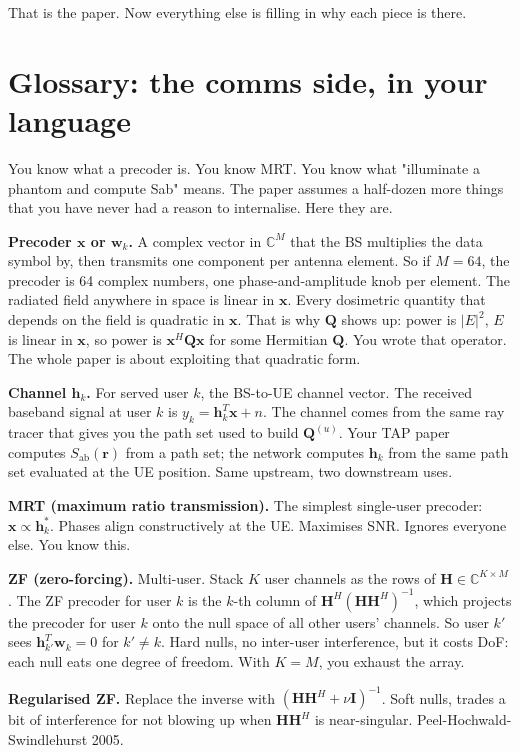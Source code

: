 \documentclass[11pt]{article}
\newenvironment{defs}[1][]{%
  \begin{mdframed}[backgroundcolor=blue!4,linecolor=blue!40!black,
    linewidth=0.4pt,roundcorner=2pt,innertopmargin=8pt,
    innerbottommargin=8pt,innerleftmargin=10pt,innerrightmargin=10pt,
    frametitle={\textbf{#1}},frametitlebackgroundcolor=blue!10]%
}{\end{mdframed}}
\newcommand{\rr}{\mathbf{r}}
\newcommand{\xx}{\mathbf{x}}
\newcommand{\hh}{\mathbf{h}}
\newcommand{\ww}{\mathbf{w}}
\newcommand{\Sab}{S_{\mathrm{ab}}}
\newcommand{\Qmat}{\mathbf{Q}}
\begin{document}
That is the paper. Now everything else is filling in why each piece is
there.

\section{Glossary: the comms side, in your language}

You know what a precoder is. You know MRT. You know what "illuminate a
phantom and compute Sab" means. The paper assumes a half-dozen more
things that you have never had a reason to internalise. Here they are.

\begin{defs}[Precoding terms cheat sheet]
\textbf{Precoder $\xx$ or $\ww_k$.} A complex vector in $\mathbb{C}^M$
that the BS multiplies the data symbol by, then transmits one component
per antenna element. So if $M=64$, the precoder is 64 complex numbers,
one phase-and-amplitude knob per element. The radiated field anywhere
in space is linear in $\xx$. Every dosimetric quantity that depends on
the field is quadratic in $\xx$. That is why $\Qmat$ shows up: power
is $|E|^2$, $E$ is linear in $\xx$, so power is $\xx^H \Qmat \xx$ for
some Hermitian $\Qmat$. You wrote that operator. The whole paper is
about exploiting that quadratic form.

\textbf{Channel $\hh_k$.} For served user $k$, the BS-to-UE channel
vector. The received baseband signal at user $k$ is $y_k = \hh_k^T \xx
+ n$. The channel comes from the same ray tracer that gives you the
path set used to build $\Qmat^{(u)}$. Your TAP paper computes
$\Sab(\rr)$ from a path set; the network computes $\hh_k$ from the
same path set evaluated at the UE position. Same upstream, two
downstream uses.

\textbf{MRT (maximum ratio transmission).} The simplest single-user
precoder: $\xx \propto \hh_k^*$. Phases align constructively at the UE.
Maximises SNR. Ignores everyone else. You know this.

\textbf{ZF (zero-forcing).} Multi-user. Stack $K$ user channels as the
rows of $\mathbf{H} \in \mathbb{C}^{K \times M}$. The ZF precoder for
user $k$ is the $k$-th column of $\mathbf{H}^H (\mathbf{H} \mathbf{H}^H)^{-1}$,
which projects the precoder for user $k$ onto the null space of all
other users' channels. So user $k'$ sees $\hh_{k'}^T \ww_k = 0$ for
$k' \neq k$. Hard nulls, no inter-user interference, but it costs DoF:
each null eats one degree of freedom. With $K=M$, you exhaust the
array.

\textbf{Regularised ZF.} Replace the inverse with
$(\mathbf{H} \mathbf{H}^H + \nu \mathbf{I})^{-1}$. Soft nulls, trades
a bit of interference for not blowing up when $\mathbf{H} \mathbf{H}^H$
is near-singular. Peel-Hochwald-Swindlehurst 2005.


\end{defs}
\end{document}
